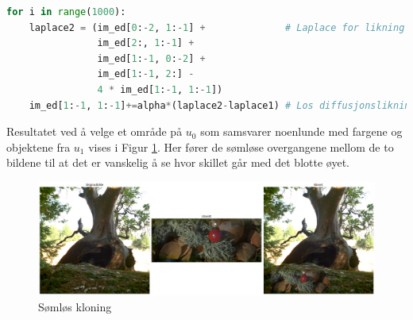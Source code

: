 \begin{lstlisting}[language=Python]
for i in range(1000):
    laplace2 = (im_ed[0:-2, 1:-1] +              # Laplace for likning 2
                im_ed[2:, 1:-1] +    
                im_ed[1:-1, 0:-2] +
                im_ed[1:-1, 2:] -
                4 * im_ed[1:-1, 1:-1])
    im_ed[1:-1, 1:-1]+=alpha*(laplace2-laplace1) # Los diffusjonslikningen
\end{lstlisting}
Resultatet ved å velge et område på $u_0$ som samsvarer noenlunde med fargene og objektene fra $u_1$ vises i Figur \ref{fig:seamless}. Her fører de sømløse overgangene mellom de to bildene til at det er vanskelig å se hvor skillet går med det blotte øyet. 
\begin{figure}[H]
\begin{center}
    \includegraphics[width=1\columnwidth]{bilder/kloning.png}
    \caption{Sømløs kloning
    \label{fig:seamless}} 
\end{center}
\end{figure}

